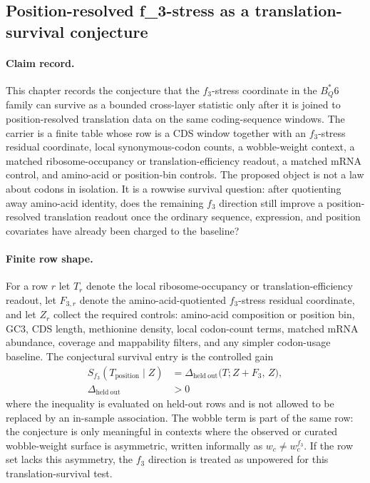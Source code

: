 \subsection{Position-resolved f\_3-stress as a translation-survival conjecture}
\label{sec:q6-f3-stress-position-resolved-translation-survival-cross-layer}

\paragraph{Claim record.}
This chapter records the conjecture that the $f_3$-stress coordinate in the $B^*_Q6$ family can survive as a bounded cross-layer statistic only after it is joined to position-resolved translation data on the same coding-sequence windows. The carrier is a finite table whose row is a CDS window together with an $f_3$-stress residual coordinate, local synonymous-codon counts, a wobble-weight context, a matched ribosome-occupancy or translation-efficiency readout, a matched mRNA control, and amino-acid or position-bin controls. The proposed object is not a law about codons in isolation. It is a rowwise survival question: after quotienting away amino-acid identity, does the remaining $f_3$ direction still improve a position-resolved translation readout once the ordinary sequence, expression, and position covariates have already been charged to the baseline?

\paragraph{Finite row shape.}
For a row $r$ let $T_r$ denote the local ribosome-occupancy or translation-efficiency readout, let $F_{3,r}$ denote the amino-acid-quotiented $f_3$-stress residual coordinate, and let $Z_r$ collect the required controls: amino-acid composition or position bin, GC3, CDS length, methionine density, local codon-count terms, matched mRNA abundance, coverage and mappability filters, and any simpler codon-usage baseline. The conjectural survival entry is the controlled gain
$$
\begin{aligned}
S_{f_3}(T_{\mathrm{position}} \mid Z)
  &= \Delta_{\mathrm{held\ out}}\bigl(T; Z + F_3,\, Z\bigr),\\
\Delta_{\mathrm{held\ out}} &> 0
\end{aligned}
$$
where the inequality is evaluated on held-out rows and is not allowed to be replaced by an in-sample association. The wobble term is part of the same row: the conjecture is only meaningful in contexts where the observed or curated wobble-weight surface is asymmetric, written informally as $w_c \neq w_c^{f_3}$. If the row set lacks this asymmetry, the $f_3$ direction is treated as unpowered for this translation-survival test.

